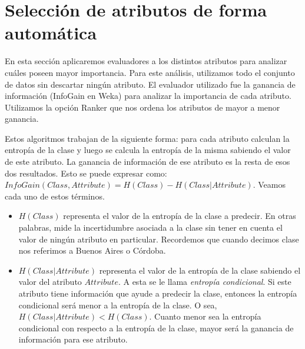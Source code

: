 
\section{Selección de atributos de forma automática}



En esta sección aplicaremos evaluadores a los distintos atributos para analizar cuáles poseen mayor importancia. Para este análisis, utilizamos todo el conjunto de datos sin descartar ningún atributo. El evaluador utilizado fue la ganancia de información (InfoGain en Weka) para analizar la importancia de cada atributo. Utilizamos la opción Ranker que nos ordena los atributos de mayor a menor ganancia.

Estos algoritmos trabajan de la siguiente forma: para cada atributo calculan la entropía de la clase y luego se calcula la entropía de la misma sabiendo el valor de este atributo. La ganancia de información de ese atributo es la resta de esos dos resultados. Esto se puede expresar como: $InfoGain(Class,Attribute) = H(Class) - H(Class | Attribute)$. Veamos cada uno de estos términos.

\begin{itemize}
	\item $H(Class)$ representa el valor de la entropía de la clase a predecir. En otras palabras, mide la incertidumbre asociada a la clase sin tener en cuenta el valor de ningún atributo en particular. Recordemos que cuando decimos clase nos referimos a Buenos Aires o Córdoba.
	
	\item  $H(Class | Attribute)$ representa el valor de la entropía de la clase sabiendo el valor del atributo $Attribute$. A esta se le llama \textit{entropía condicional}. Si este atributo tiene información que ayude a predecir la clase, entonces la entropía condicional será menor a la entropía de la clase. O sea, $H(Class | Attribute) < H(Class)$. Cuanto menor sea la entropía condicional con respecto a la entropía de la clase, mayor será la ganancia de información para ese atributo.
\end{itemize}

